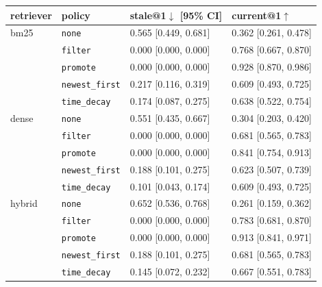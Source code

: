 \begin{tabular}{llll}
\toprule
retriever & policy & stale@1$\downarrow$ [95\% CI] & current@1$\uparrow$ \\
\midrule
bm25 & \texttt{none} & 0.565 [0.449, 0.681] & 0.362 [0.261, 0.478] \\
 & \texttt{filter} & 0.000 [0.000, 0.000] & 0.768 [0.667, 0.870] \\
 & \texttt{promote} & 0.000 [0.000, 0.000] & 0.928 [0.870, 0.986] \\
\midrule
 & \texttt{newest\_first} & 0.217 [0.116, 0.319] & 0.609 [0.493, 0.725] \\
 & \texttt{time\_decay} & 0.174 [0.087, 0.275] & 0.638 [0.522, 0.754] \\
dense & \texttt{none} & 0.551 [0.435, 0.667] & 0.304 [0.203, 0.420] \\
\midrule
 & \texttt{filter} & 0.000 [0.000, 0.000] & 0.681 [0.565, 0.783] \\
 & \texttt{promote} & 0.000 [0.000, 0.000] & 0.841 [0.754, 0.913] \\
 & \texttt{newest\_first} & 0.188 [0.101, 0.275] & 0.623 [0.507, 0.739] \\
 & \texttt{time\_decay} & 0.101 [0.043, 0.174] & 0.609 [0.493, 0.725] \\
hybrid & \texttt{none} & 0.652 [0.536, 0.768] & 0.261 [0.159, 0.362] \\
 & \texttt{filter} & 0.000 [0.000, 0.000] & 0.783 [0.681, 0.870] \\
 & \texttt{promote} & 0.000 [0.000, 0.000] & 0.913 [0.841, 0.971] \\
 & \texttt{newest\_first} & 0.188 [0.101, 0.275] & 0.681 [0.565, 0.783] \\
 & \texttt{time\_decay} & 0.145 [0.072, 0.232] & 0.667 [0.551, 0.783] \\
\bottomrule
\end{tabular}

